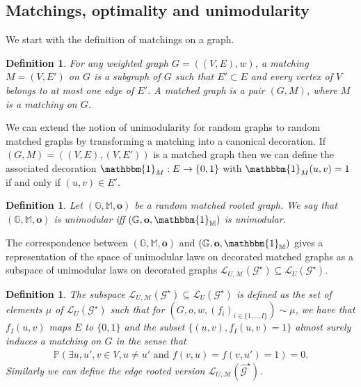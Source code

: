 \documentclass[11pt]{article}
\newtheorem{definition}[prop]{Definition}
\begin{document}
\subsection{Matchings, optimality and unimodularity}
We start with the definition of matchings on a graph.
\begin{definition}
 For any weighted graph $G=((V,E),w)$, a matching $M=(V,E')$ on $G$ is a subgraph of $G$ such that $E' \subset E$ and  every vertex of $V$ belongs to at most one edge of $E'$. A matched graph is a pair $(G,M)$, where $M$ is a matching on $G$.
\end{definition}
We can extend the notion of unimodularity for random graphs to random matched graphs by transforming a matching into a canonical decoration. If $(G,M)=((V,E),(V,E'))$  is a matched graph then we can define the associated decoration $\mathbbm{1}_{M}:E\to\{0,1\}$ with  $\mathbbm{1}_{M}(u,v)=1$ if and only if $(u,v) \in E'$.
\begin{definition}
Let $(\mathbb{G},\mathbb M,\mathbf{o})$ be a random matched rooted graph. 
    We say that $(\mathbb{G},\mathbb{M},\mathbf{o})$ is unimodular iff $(\mathbb{G},\mathbf{o},\mathbbm{1}_{\mathbb{M}})$ is unimodular.
\end{definition}
The correspondence between $(\mathbb{G},\mathbb{M},\mathbf{o})$ and $(\mathbb{G},\mathbf{o},\mathbbm{1}_{\mathbb{M}})$ gives a representation of the space of unimodular laws on decorated matched graphs as a subspace of unimodular laws on decorated graphs $\mathcal{L}_{U,\mathcal{M}}(\mathcal{G}^{\star}) \subseteq \mathcal{L}_{U}(\mathcal{G}^{\star})$.
\begin{definition}
The subspace $\mathcal{L}_{U,\mathcal{M}}(\mathcal{G}^{\star}) \subseteq \mathcal{L}_{U}(\mathcal{G}^{\star})$ is defined as the set of 
elements $\mu$ of $\mathcal{L}_{U}(\mathcal{G}^{\star})$ such that for $(G,o,w,(f_i)_{i \in \{1,..,I\}}) \sim \mu$, we have that $f_I(u,v)$ maps $E$ to $\{0,1\}$ and the subset $\{(u,v), f_I(u,v)=1 \}$ almost surely induces a matching on $G$ in the sense that
\begin{align*}
    \mathbb{P}\left( \exists u,u',v \in V, u \neq u' \text{ and } f(v,u)=f(v,u')=1\right)=0.
\end{align*}
Similarly we can define the edge rooted version $\mathcal{L}_{U,\mathcal{M}}(\hat{\mathcal{G}}^{\star})$.
\end{definition}
\end{document}
